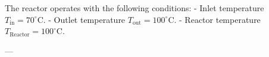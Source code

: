 The reactor operates with the following conditions:  
- Inlet temperature \( T_{\text{in}} = 70^\circ\text{C} \).  
- Outlet temperature \( T_{\text{out}} = 100^\circ\text{C} \).  
- Reactor temperature \( T_{\text{Reactor}} = 100^\circ\text{C} \).  

---